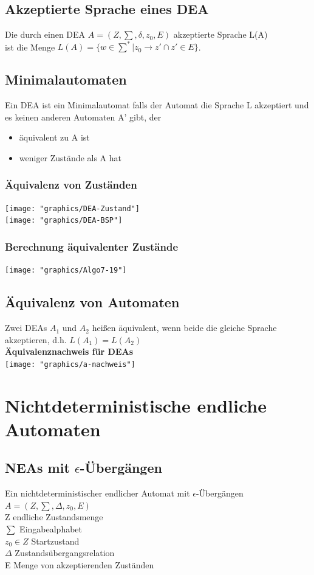 \documentclass{scrreprt}
\newcommand\tab[1][1cm]{\hspace*{#1}}
\begin{document}
\section{Akzeptierte Sprache eines DEA}
Die durch einen DEA $A=(Z,\sum,\delta,z_{0},E)$ akzeptierte Sprache L(A)
\\ist die Menge $L(A)=\{w\in \sum^{*}|z_{0}\rightarrow z' \cap z' \in E\}$.
\section{Minimalautomaten}
Ein DEA ist ein Minimalautomat falls der Automat die Sprache L akzeptiert und es keinen anderen Automaten A' gibt, der
\begin{itemize}
    \item äquivalent zu A ist 
    \item weniger Zustände als A hat
\end{itemize}
\subsection{Äquivalenz von Zuständen}
\texttt{[image: "graphics/DEA-Zustand"]}
\\\texttt{[image: "graphics/DEA-BSP"]}
\subsection{Berechnung äquivalenter Zustände}
\texttt{[image: "graphics/Algo7-19"]}
\section{Äquivalenz von Automaten}
Zwei DEAs $A_{1}$ und $A_{2}$ heißen äquivalent, wenn beide die gleiche Sprache akzeptieren, d.h. \tab $L(A_{1})=L(A_{2})$
\\\textbf{Äquivalenznachweis für DEAs}
\\\texttt{[image: "graphics/a-nachweis"]}
\chapter{Nichtdeterministische endliche Automaten}
\section{NEAs mit $\epsilon$-Übergängen}
Ein nichtdeterministischer endlicher Automat mit $\epsilon$-Übergängen
\\$A=(Z,\sum,\Delta,z_{0},E)$
\\Z \tab endliche Zustandsmenge
\\$\sum$ \tab Eingabealphabet
\\$z_{0} \in Z$ \tab Startzustand
\\$\Delta$ \tab Zustandsübergangsrelation
\\E \tab Menge von akzeptierenden Zuständen
\end{document}
